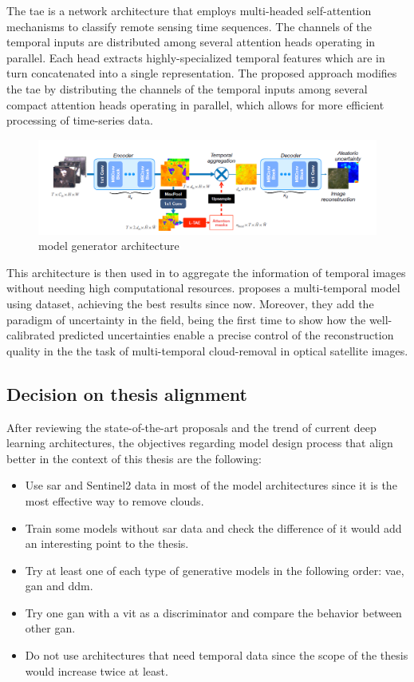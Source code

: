 \documentclass[../main.tex]{subfiles}
\begin{document}
The  \gls{tae} is a network architecture that employs multi-headed self-attention mechanisms to classify remote sensing time sequences. The channels of the temporal inputs are distributed among several attention heads operating in parallel. Each head extracts highly-specialized temporal features which are in turn concatenated into a single representation. The proposed approach modifies the \gls{tae} by distributing the channels of the temporal inputs among several compact attention heads operating in parallel, which allows for more efficient processing of time-series data. 
\begin{figure}[H]
	\centering
	\includegraphics[width=15cm]{imgs/relatedwork/uncertainty}
	\caption{\cite{uncrtaints2021ebel} model generator architecture}
\end{figure}
This architecture is then used in \cite{uncrtaints2021ebel} to aggregate the information of temporal images without needing high computational resources. \cite{uncrtaints2021ebel} proposes a multi-temporal model using \cite{sen12mscrts} dataset, achieving the best results since now. Moreover, they add the paradigm of uncertainty in the field, being the first time to show how the well-calibrated predicted uncertainties
enable a precise control of the reconstruction quality in the the task of multi-temporal
cloud-removal in optical satellite images.

\subsection{Decision on thesis alignment}
After reviewing the state-of-the-art proposals and the trend of current deep learning architectures, the objectives regarding model design process that align better in the context of this thesis are the following:
\begin{itemize}
	\item Use \gls{sar} and Sentinel2 data in most of the model architectures since it is the most effective way to remove clouds.
	\item Train some models without \gls{sar} data and check the difference of it would add an interesting point to the thesis.
	\item Try at least one of each type of generative models in the following order: \gls{vae}, \gls{gan} and \gls{ddm}.
	\item Try one \gls{gan} with a \gls{vit} as a discriminator and compare the behavior between other \gls{gan}.
	\item Do not use architectures that need temporal data since the scope of the thesis would increase twice at least.
\end{itemize}
\end{document}

